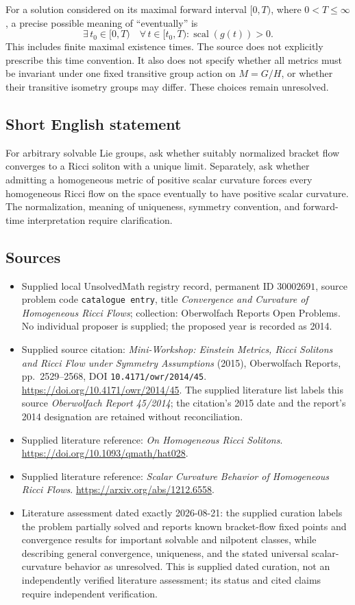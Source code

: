 \documentclass[11pt]{article}
\begin{document}
For a solution considered on its maximal forward interval \([0,T)\), where \(0<T\leq\infty\), a precise possible meaning of ``eventually'' is
\[
\exists\,t_0\in[0,T)\quad\forall\,t\in[t_0,T):
\operatorname{scal}(g(t))>0.
\]
This includes finite maximal existence times. The source does not explicitly prescribe this time convention. It also does not specify whether all metrics must be invariant under one fixed transitive group action on \(M=G/H\), or whether their transitive isometry groups may differ. These choices remain unresolved.
\subsection{Short English statement}
For arbitrary solvable Lie groups, ask whether suitably normalized bracket flow converges to a Ricci soliton with a unique limit. Separately, ask whether admitting a homogeneous metric of positive scalar curvature forces every homogeneous Ricci flow on the space eventually to have positive scalar curvature. The normalization, meaning of uniqueness, symmetry convention, and forward-time interpretation require clarification.
\subsection{Sources}
\begin{itemize}
\item Supplied local UnsolvedMath registry record, permanent ID \(30002691\), source problem code \texttt{catalogue entry}, title \emph{Convergence and Curvature of Homogeneous Ricci Flows}; collection: Oberwolfach Reports Open Problems. No individual proposer is supplied; the proposed year is recorded as 2014.
\item Supplied source citation: \emph{Mini-Workshop: Einstein Metrics, Ricci Solitons and Ricci Flow under Symmetry Assumptions} (2015), Oberwolfach Reports, pp.\ 2529--2568, DOI \texttt{10.4171/owr/2014/45}. \url{https://doi.org/10.4171/owr/2014/45}. The supplied literature list labels this source \emph{Oberwolfach Report 45/2014}; the citation's 2015 date and the report's 2014 designation are retained without reconciliation.
\item Supplied literature reference: \emph{On Homogeneous Ricci Solitons}. \url{https://doi.org/10.1093/qmath/hat028}.
\item Supplied literature reference: \emph{Scalar Curvature Behavior of Homogeneous Ricci Flows}. \url{https://arxiv.org/abs/1212.6558}.
\item Literature assessment dated exactly 2026-08-21: the supplied curation labels the problem partially solved and reports known bracket-flow fixed points and convergence results for important solvable and nilpotent classes, while describing general convergence, uniqueness, and the stated universal scalar-curvature behavior as unresolved. This is supplied dated curation, not an independently verified literature assessment; its status and cited claims require independent verification.
\end{itemize}
\end{document}
